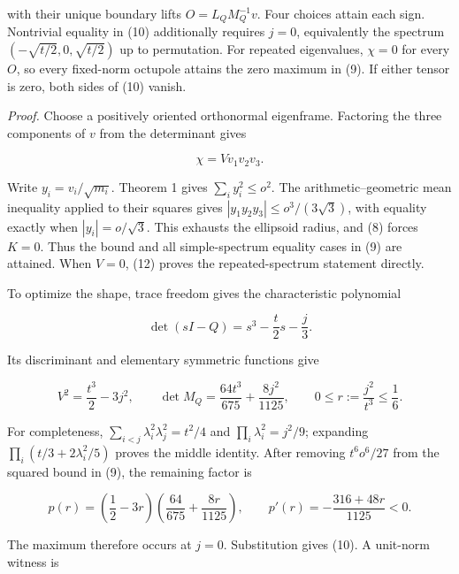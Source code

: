 \documentclass[aps,prd,reprint,onecolumn,11pt,nofootinbib,notitlepage]{revtex4-2}
\begin{document}
with their unique boundary lifts \(O=L_QM_Q^{-1}v\). Four choices attain each sign. Nontrivial equality in (10) additionally requires \(j=0\), equivalently the spectrum \((-\sqrt{t/2},0,\sqrt{t/2})\) up to permutation. For repeated eigenvalues, \(\chi=0\) for every \(O\), so every fixed-norm octupole attains the zero maximum in (9). If either tensor is zero, both sides of (10) vanish.

\emph{Proof.} Choose a positively oriented orthonormal eigenframe. Factoring the three components of \(v\) from the determinant gives

\begin{equation}
 \chi=Vv_1v_2v_3.
 \tag{12}
\end{equation}

Write \(y_i=v_i/\sqrt{m_i}\). Theorem 1 gives \(\sum_i y_i^2\le o^2\). The arithmetic--geometric mean inequality applied to their squares gives \(|y_1y_2y_3|\le o^3/(3\sqrt3)\), with equality exactly when \(|y_i|=o/\sqrt3\). This exhausts the ellipsoid radius, and (8) forces \(K=0\). Thus the bound and all simple-spectrum equality cases in (9) are attained. When \(V=0\), (12) proves the repeated-spectrum statement directly.

To optimize the shape, trace freedom gives the characteristic polynomial

\begin{equation}
 \det(sI-Q)=s^3-\frac t2s-\frac j3.
 \tag{13}
\end{equation}

Its discriminant and elementary symmetric functions give

\begin{equation}
 V^2=\frac{t^3}{2}-3j^2,\qquad
 \det M_Q=\frac{64t^3}{675}+\frac{8j^2}{1125},\qquad
 0\le r:=\frac{j^2}{t^3}\le\frac16.
 \tag{14}
\end{equation}

For completeness, \(\sum_{i<j}\lambda_i^2\lambda_j^2=t^2/4\) and \(\prod_i\lambda_i^2=j^2/9\); expanding \(\prod_i(t/3+2\lambda_i^2/5)\) proves the middle identity. After removing \(t^6o^6/27\) from the squared bound in (9), the remaining factor is

\begin{equation}
 p(r)=\left(\frac12-3r\right)
       \left(\frac{64}{675}+\frac{8r}{1125}\right),\qquad
 p'(r)=-\frac{316+48r}{1125}<0.
 \tag{15}
\end{equation}

The maximum therefore occurs at \(j=0\). Substitution gives (10). A unit-norm witness is
\end{document}
